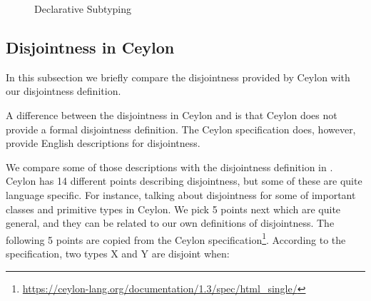 \begin{figure}[t]
  \caption{Declarative Subtyping}
  \label{fig:discussion:ds}
\end{figure}

\subsection{Disjointness in Ceylon}
\label{sec:discussion:ceylon}

In this subsection
we briefly compare the disjointness provided by Ceylon with our disjointness definition.
\begin{comment}
\ningning{A similar example is used in the overview. Maybe we want to be
  consistent with the examples.}
\baber{I will make this example consistent with the example in overview. But I suppose
  I should be using Ceylon syntax in this section.}

\begin{figure}[t]
\begin{lstlisting}[xleftmargin=.2\textwidth, xrightmargin=.2\textwidth]
// Student <: Person
// speak function will not type check
void speak(Person | Student val) {
  switch (val)
  case (is Person) {print("person speaks");}
  case (is Student) {print("student speaks");} 
}
\end{lstlisting}
\caption{Ceylon disjointness code example.}
\label{discussion:list:ceylon}
\end{figure}

\noindent The function \emph{speak} in \Cref{discussion:list:ceylon} 
will not type check in Ceylon. Because \emph{Person} and
\emph{Student} are not disjoint types. \emph{Person} and \emph{Student} both have a common
subtype which is \emph{Student}. \cal will also reject such programs.
\end{comment}
A difference between the disjointness in Ceylon and \cal is that
Ceylon does not provide
a formal disjointness definition.
The Ceylon specification does, however, provide English descriptions
for disjointness. 

We compare some of those descriptions with
the disjointness definition in \cal. Ceylon has 14 different points describing
disjointness, but some of these are quite language specific. For instance, talking
about disjointness for some of important classes and primitive types in Ceylon.
We pick 5 points next which are quite general, and they can be related to our
own definitions of disjointness. The following 5 points are copied from the
Ceylon specification\footnote{\url{https://ceylon-lang.org/documentation/1.3/spec/html_single/}}.
According to the specification, two types X and Y are disjoint when:

